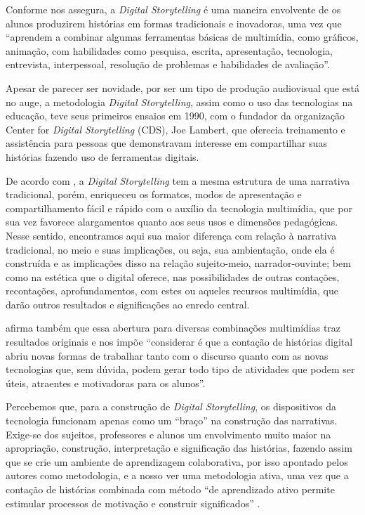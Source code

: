\documentclass[portuguese]{textolivre}
\begin{document}
Conforme \textcite[p.~1]{signes2010practical} nos assegura, a \textit{Digital Storytelling} é uma maneira envolvente de os alunos produzirem histórias em formas tradicionais e inovadoras, uma vez que “aprendem a combinar algumas ferramentas básicas de multimídia, como gráficos, animação, com habilidades como pesquisa, escrita, apresentação, tecnologia, entrevista, interpessoal, resolução de problemas e habilidades de avaliação”.

Apesar de parecer ser novidade, por ser um tipo de produção audiovisual que está no auge, a metodologia \textit{Digital Storytelling}, assim como o uso das tecnologias na educação, teve seus primeiros ensaios em 1990, com o fundador da organização Center for \textit{Digital Storytelling} (CDS), Joe Lambert, que oferecia treinamento e assistência para pessoas que demonstravam interesse em compartilhar suas histórias fazendo uso de ferramentas digitais.

De acordo com \textcite{signes2010practical}, a \textit{Digital Storytelling} tem a mesma estrutura de uma narrativa tradicional, porém, enriqueceu os formatos, modos de apresentação e compartilhamento fácil e rápido com o auxílio da tecnologia multimídia, que por sua vez favorece alargamentos quanto aos seus usos e dimensões pedagógicas. Nesse sentido, encontramos aqui sua maior diferença com relação à narrativa tradicional, no meio e suas implicações, ou seja, sua ambientação, onde ela é construída e as implicações disso na relação sujeito-meio, narrador-ouvinte; bem como na estética que o digital oferece, nas possibilidades de outras contações, recontações, aprofundamentos, com estes ou aqueles recursos multimídia, que darão outros resultados e significações ao enredo central.

\textcite[p.~3]{signes2010practical} afirma também que essa abertura para diversas combinações multimídias traz resultados originais e nos impõe “considerar é que a contação de histórias digital abriu novas formas de trabalhar tanto com o discurso quanto com as novas tecnologias que, sem dúvida, podem gerar todo tipo de atividades que podem ser úteis, atraentes e motivadoras para os alunos”.

Percebemos que, para a construção de \textit{Digital Storytelling}, os dispositivos da tecnologia funcionam apenas como um “braço” na construção das narrativas. Exige-se dos sujeitos, professores e alunos um envolvimento muito maior na apropriação, construção, interpretação e significação das histórias, fazendo assim que se crie um ambiente de aprendizagem colaborativa, por isso apontado pelos autores como metodologia, e a nosso ver uma metodologia ativa, uma vez que a contação de histórias combinada com método “de aprendizado ativo permite estimular processos de motivação e construir significados” \cite[p.~223]{valenca2019storytelling}.
\end{document}
